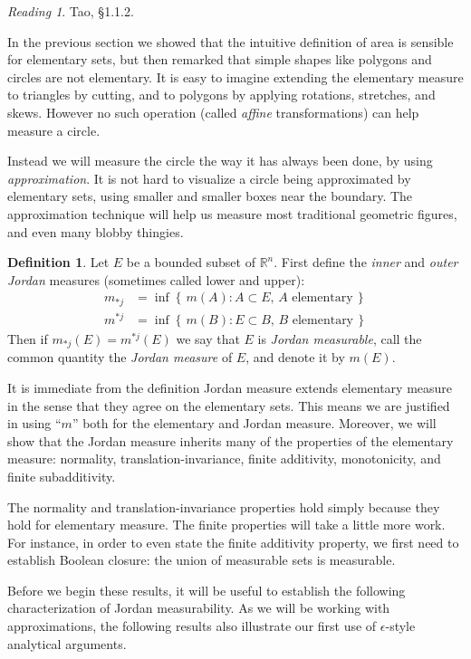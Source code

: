 \documentclass[11pt,oneside]{amsbook}
\newcommand{\set}[1]{\left\{\,#1\,\right\}}
\newcommand{\RR}{{\mathbb R}}
\theoremstyle{definition}
\theoremstyle{plain}
\theoremstyle{definition}
\newtheorem{defn}[thm]{Definition}
\theoremstyle{remark}
\newtheorem*{reading}{Reading}
\numberwithin{equation}{section}
\numberwithin{figure}{section}
\begin{document}
\begin{reading}
  Tao, \S1.1.2.
\end{reading}

In the previous section we showed that the intuitive definition of area is sensible for elementary sets, but then remarked that simple shapes like polygons and circles are not elementary. It is easy to imagine extending the elementary measure to triangles by cutting, and to polygons by applying rotations, stretches, and skews. However no such operation (called \emph{affine} transformations) can help measure a circle.

Instead we will measure the circle the way it has always been done, by using \emph{approximation}. It is not hard to visualize a circle being approximated by elementary sets, using smaller and smaller boxes near the boundary. The approximation technique will help us measure most traditional geometric figures, and even many blobby thingies.

\begin{defn}
  Let $E$ be a bounded subset of $\RR^n$. First define the \emph{inner} and \emph{outer Jordan} measures (sometimes called lower and upper):
  \begin{align*}
    m_{*j}&=\inf\set{m(A):A\subset E,\, A\text{ elementary}}\\
    m^{*j}&=\inf\set{m(B):E\subset B,\, B\text{ elementary}}
  \end{align*}
  Then if $m_{*j}(E)=m^{*j}(E)$ we say that $E$ is \emph{Jordan measurable}, call the common quantity the \emph{Jordan measure} of $E$, and denote it by $m(E)$.
\end{defn}

It is immediate from the definition Jordan measure extends elementary measure in the sense that they agree on the elementary sets. This means we are justified in using ``$m$'' both for the elementary and Jordan measure. Moreover, we will show that the Jordan measure inherits many of the properties of the elementary measure: normality, translation-invariance, finite additivity, monotonicity, and finite subadditivity.

The normality and translation-invariance properties hold simply because they hold for elementary measure. The finite properties will take a little more work. For instance, in order to even state the finite additivity property, we first need to establish Boolean closure: the union of measurable sets is measurable.

Before we begin these results, it will be useful to establish the following characterization of Jordan measurability. As we will be working with approximations, the following results also illustrate our first use of $\epsilon$-style analytical arguments.
\end{document}
